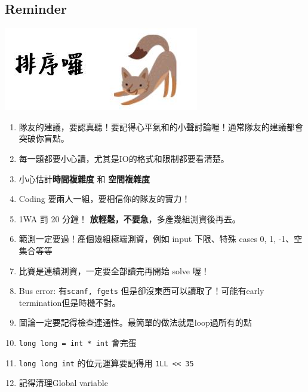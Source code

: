 \documentclass[10pt,oneside]{article}
\begin{document}
\begin{landscape}
\begin{multicols}{2}

\section{Reminder}

\includegraphics{sorting3}

\begin{enumerate}
	\item 隊友的建議，要認真聽！要記得心平氣和的小聲討論喔！通常隊友的建議都會突破你盲點。
	\item 每一題都要小心讀，尤其是IO的格式和限制都要看清楚。%
	\item 小心估計\textbf{時間複雜度} 和 \textbf{空間複雜度}%
	\item Coding 要兩人一組，要相信你的隊友的實力！
	\item 1WA 罰 20 分鐘！ \textbf{放輕鬆，不要急}，多產幾組測資後再丟。%
	\item 範測一定要過！產個幾組極端測資，例如 input 下限、特殊 cases 0, 1, -1、空集合等等 %
	\item 比賽是連續測資，一定要全部讀完再開始 solve 喔！%
	\item Bus error: 有\texttt{scanf, fgets} 但是卻沒東西可以讀取了！可能有early termination但是時機不對。 %
	\item 圖論一定要記得檢查連通性。最簡單的做法就是loop過所有的點%
	\item \texttt{long long = int * int} 會完蛋%
	\item \texttt{long long int} 的位元運算要記得用 \texttt{1LL << 35} %
	\item 記得清理Global variable
\end{enumerate}


\end{multicols}
\end{landscape}
\end{document}
